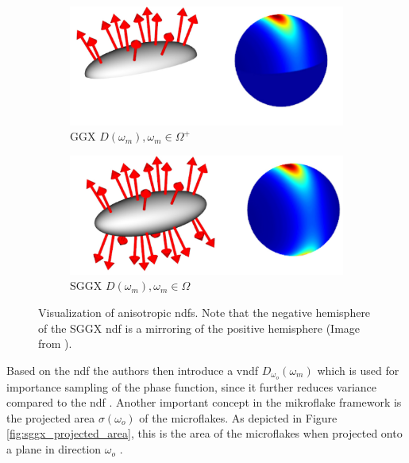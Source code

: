 \begin{figure}[ht]
    \centering
    \begin{subfigure}[b]{0.45\linewidth}
        \centering
        \includegraphics[width=\linewidth]{img/sggx_ndf_a.jpg}
        \caption{GGX $D(\omega_m), \omega_m \in \Omega^+$}
        \label{fig:sggx_ndf_a}
    \end{subfigure}
    \begin{subfigure}[b]{0.45\linewidth}
        \centering
        \includegraphics[width=1\linewidth]{img/sggx_ndf_b.jpg}
        \caption{SGGX $D(\omega_m), \omega_m \in \Omega$}
        \label{fig:sggx_ndf_b}
    \end{subfigure}
	\caption[Visualization of anisotropic \acsp{ndf}]{Visualization of anisotropic \acsp{ndf}. Note that the negative hemisphere of the SGGX \acs{ndf} is a mirroring of the positive hemisphere (Image from \cite{sggx}).}
	\label{fig:sggx_ndf}
\end{figure}
Based on the \acs{ndf} the authors then introduce a \ac{vndf} $D_{\omega_o}(\omega_m)$ which is used for importance sampling of the phase function, since it further reduces variance compared to the \acs{ndf} \cite{vndf_importance_sampling}.
Another important concept in the mikroflake framework is the projected area $\sigma(\omega_o)$ of the microflakes.
As depicted in Figure \ref{fig:sggx_projected_area}, this is the area of the microflakes when projected onto a plane in direction $\omega_o$ \cite{sggx}.
